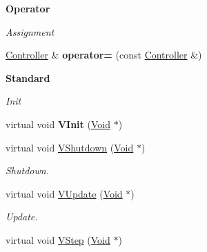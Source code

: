 \begin{Indent}{\bf Operator}\par
{\em \label{_amgrpe1b3ec89ead7f83a9245ed5c9cacfdbf}
 Assignment }\begin{DoxyCompactItemize}
\item 
\hypertarget{classContent_1_1Actor_1_1Admin_1_1Controller_a0503df4c7087a43b3affff5c661cb7dc}{
\hyperlink{classContent_1_1Actor_1_1Admin_1_1Controller}{Controller} \& {\bfseries operator=} (const \hyperlink{classContent_1_1Actor_1_1Admin_1_1Controller}{Controller} \&)}
\label{classContent_1_1Actor_1_1Admin_1_1Controller_a0503df4c7087a43b3affff5c661cb7dc}

\end{DoxyCompactItemize}
\end{Indent}
\begin{Indent}{\bf Standard}\par
{\em \label{_amgrpeb6d8ae6f20283755b339c0dc273988b}
 Init }\begin{DoxyCompactItemize}
\item 
\hypertarget{classContent_1_1Actor_1_1Admin_1_1Controller_a9a7233f080635b2242ba9d2605657e99}{
virtual void {\bfseries VInit} (\hyperlink{structVoid}{Void} $\ast$)}
\label{classContent_1_1Actor_1_1Admin_1_1Controller_a9a7233f080635b2242ba9d2605657e99}

\item 
\hypertarget{classContent_1_1Actor_1_1Admin_1_1Controller_a1727b05471689f85135b55071222cb35}{
virtual void \hyperlink{classContent_1_1Actor_1_1Admin_1_1Controller_a1727b05471689f85135b55071222cb35}{VShutdown} (\hyperlink{structVoid}{Void} $\ast$)}
\label{classContent_1_1Actor_1_1Admin_1_1Controller_a1727b05471689f85135b55071222cb35}

\begin{DoxyCompactList}\small\item\em Shutdown. \item\end{DoxyCompactList}\item 
\hypertarget{classContent_1_1Actor_1_1Admin_1_1Controller_aca966560eaed4133e9b528b8fdabf724}{
virtual void \hyperlink{classContent_1_1Actor_1_1Admin_1_1Controller_aca966560eaed4133e9b528b8fdabf724}{VUpdate} (\hyperlink{structVoid}{Void} $\ast$)}
\label{classContent_1_1Actor_1_1Admin_1_1Controller_aca966560eaed4133e9b528b8fdabf724}

\begin{DoxyCompactList}\small\item\em Update. \item\end{DoxyCompactList}\item 
\hypertarget{classContent_1_1Actor_1_1Admin_1_1Controller_a05d56f62f47ced6c158e82678c7a582e}{
virtual void \hyperlink{classContent_1_1Actor_1_1Admin_1_1Controller_a05d56f62f47ced6c158e82678c7a582e}{VStep} (\hyperlink{structVoid}{Void} $\ast$)}
\label{classContent_1_1Actor_1_1Admin_1_1Controller_a05d56f62f47ced6c158e82678c7a582e}


\end{DoxyCompactItemize}
\end{Indent}

